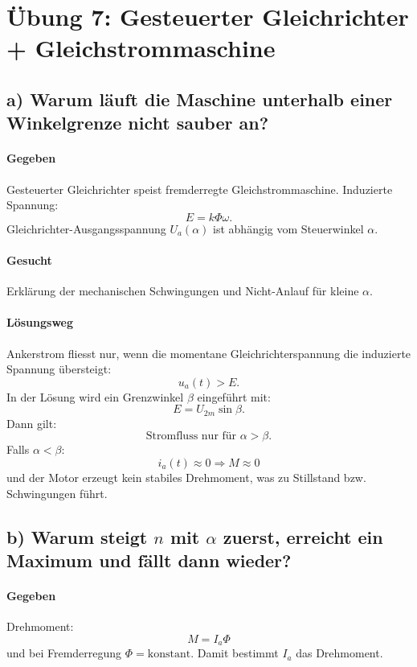 \section{Übung 7: Gesteuerter Gleichrichter + Gleichstrommaschine}

\subsection*{a) Warum läuft die Maschine unterhalb einer Winkelgrenze nicht sauber an?}

\paragraph{Gegeben}
Gesteuerter Gleichrichter speist fremderregte Gleichstrommaschine.
Induzierte Spannung:
\[
\boxed{E = k\Phi \omega.}
\]
Gleichrichter-Ausgangsspannung $U_a(\alpha)$ ist abhängig vom Steuerwinkel $\alpha$.

\paragraph{Gesucht}
Erklärung der mechanischen Schwingungen und Nicht-Anlauf für kleine $\alpha$.

\paragraph{Lösungsweg}
Ankerstrom fliesst nur, wenn die momentane Gleichrichterspannung die induzierte Spannung übersteigt:
\[
u_a(t) > E.
\]
In der Lösung wird ein Grenzwinkel $\beta$ eingeführt mit:
\[
\boxed{E = U_{2m}\sin\beta}.
\]
Dann gilt:
\[
\boxed{\text{Stromfluss nur für }\alpha>\beta.}
\]
Falls $\alpha<\beta$:
\[
i_a(t)\approx 0\Rightarrow M\approx 0
\]
und der Motor erzeugt kein stabiles Drehmoment, was zu Stillstand bzw. Schwingungen führt.


\subsection*{b) Warum steigt $n$ mit $\alpha$ zuerst, erreicht ein Maximum und fällt dann wieder?}

\paragraph{Gegeben}
Drehmoment:
\[
\boxed{M=I_a\Phi}
\]
und bei Fremderregung $\Phi=\mathrm{konstant}$.
Damit bestimmt $I_a$ das Drehmoment.

